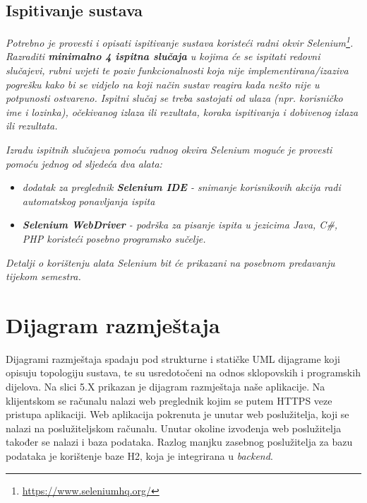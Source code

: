 			
			\subsection{Ispitivanje sustava}
			
			 \textit{Potrebno je provesti i opisati ispitivanje sustava koristeći radni okvir Selenium\footnote{\url{https://www.seleniumhq.org/}}. Razraditi \textbf{minimalno 4 ispitna slučaja} u kojima će se ispitati redovni slučajevi, rubni uvjeti te poziv funkcionalnosti koja nije implementirana/izaziva pogrešku kako bi se vidjelo na koji način sustav reagira kada nešto nije u potpunosti ostvareno. Ispitni slučaj se treba sastojati od ulaza (npr. korisničko ime i lozinka), očekivanog izlaza ili rezultata, koraka ispitivanja i dobivenog izlaza ili rezultata.\\ }
			 
			 \textit{Izradu ispitnih slučajeva pomoću radnog okvira Selenium moguće je provesti pomoću jednog od sljedeća dva alata:}
			 \begin{itemize}
			 	\item \textit{dodatak za preglednik \textbf{Selenium IDE} - snimanje korisnikovih akcija radi automatskog ponavljanja ispita	}
			 	\item \textit{\textbf{Selenium WebDriver} - podrška za pisanje ispita u jezicima Java, C\#, PHP koristeći posebno programsko sučelje.}
			 \end{itemize}
		 	\textit{Detalji o korištenju alata Selenium bit će prikazani na posebnom predavanju tijekom semestra.}
			
			\eject 
		
		
		\section{Dijagram razmještaja}
			
			\text Dijagrami razmještaja spadaju pod strukturne i statičke UML dijagrame koji opisuju topologiju sustava, te su usredotočeni na odnos sklopovskih i programskih dijelova. Na slici 5.X prikazan je dijagram razmještaja naše aplikacije. Na klijentskom se računalu nalazi web preglednik kojim se putem HTTPS veze pristupa aplikaciji. Web aplikacija pokrenuta je unutar web poslužitelja, koji se nalazi na poslužiteljskom računalu. Unutar okoline izvođenja web poslužitelja također se nalazi i baza podataka. Razlog manjku zasebnog poslužitelja za bazu podataka je korištenje baze H2, koja je integrirana u \textit{backend}.
			
